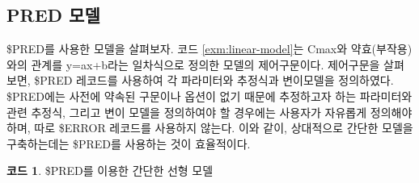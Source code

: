 \documentclass[
  11pt,
  krantz2,
  a4paper]{krantz}
\newenvironment{Shaded}{\begin{snugshade}}{\end{snugshade}}
\newcommand{\DecValTok}[1]{\textcolor[rgb]{0.00,0.00,0.81}{#1}}
\newcommand{\FloatTok}[1]{\textcolor[rgb]{0.00,0.00,0.81}{#1}}
\newcommand{\KeywordTok}[1]{\textcolor[rgb]{0.13,0.29,0.53}{\textbf{#1}}}
\newcommand{\NormalTok}[1]{#1}
\newcommand{\OperatorTok}[1]{\textcolor[rgb]{0.81,0.36,0.00}{\textbf{#1}}}
\newcommand{\StringTok}[1]{\textcolor[rgb]{0.31,0.60,0.02}{#1}}
\theoremstyle{definition}
\theoremstyle{definition}
\newtheorem{example}{코드}[chapter]
\theoremstyle{definition}
\theoremstyle{remark}
\begin{document}
\hypertarget{pred-uxbaa8uxb378}{%
\subsection{PRED 모델}\label{pred-uxbaa8uxb378}}


\$PRED를 사용한 모델을 살펴보자. 코드 \ref{exm:linear-model}는 Cmax와 약효(부작용)와의 관계를 y=ax+b라는 일차식으로 정의한 모델의 제어구문이다. 제어구문을 살펴보면, \$PRED 레코드를 사용하여 각 파라미터와 추정식과 변이모델을 정의하였다. \$PRED에는 사전에 약속된 구문이나 옵션이 없기 때문에 추정하고자 하는 파라미터와 관련 추정식, 그리고 변이 모델을 정의하여야 할 경우에는 사용자가 자유롭게 정의해야 하며, 따로 \$ERROR 레코드를 사용하지 않는다. 이와 같이, 상대적으로 간단한 모델을 구축하는데는 \$PRED를 사용하는 것이 효율적이다.

\begin{example}
\protect\hypertarget{exm:linear-model}{}{\label{exm:linear-model} }\$PRED를 이용한 간단한 선형 모델
\end{example}

\begin{Shaded}
\end{Shaded}
\end{document}
